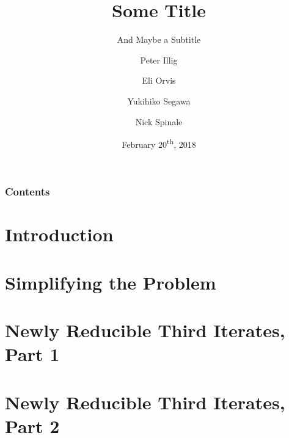 \documentclass{beamer}
\title{Some Title}
\subtitle{And Maybe a Subtitle}
\author[Illig \and Orvis \and Segawa \and Spinale]{Peter Illig \and Eli Orvis \and Yukihiko Segawa \and Nick Spinale}
\institute[Carleton]{Carleton College}
\date{February 20\textsuperscript{th}, 2018}
\begin{document}
\newtheorem{thm}{Theorem}[section]
\newtheorem{prop}[thm]{Proposition}
\newtheorem{cor}[thm]{Corollary}
\newtheorem{obs}[thm]{Observation}
\newtheorem{defn}[thm]{Definition}
\newtheorem{exmp}[thm]{Example}
\newtheorem{remk}[thm]{Remark}

\maketitle

\begin{frame}
  \frametitle{Contents}
  \tableofcontents
\end{frame}

\section{Introduction}



\section{Simplifying the Problem}



\section{Newly Reducible Third Iterates, Part 1}



\section{Newly Reducible Third Iterates, Part 2}


\end{document}
